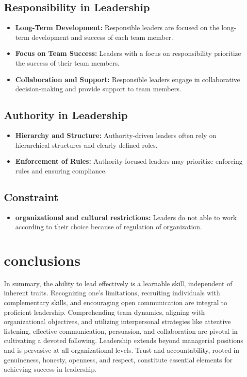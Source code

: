 \documentclass[a4paper,12pt]{report}
\begin{document}
\fontsize{14}{16}\selectfont \section{Responsibility in Leadership}
\fontsize{14}{20}\selectfont   
\begin{itemize}
\item  \textbf{Long-Term Development:} Responsible leaders are focused on the long-term development and success of each team member.
\item  \textbf{Focus on Team Success:} Leaders with a focus on responsibility prioritize the success of their team members.
\item \textbf{Collaboration and Support:} Responsible leaders engage in collaborative decision-making and provide support to team members.
\end{itemize}
\fontsize{14}{16}\selectfont \section{Authority in Leadership}
\fontsize{14}{20}\selectfont   
\begin{itemize}
\item  \textbf{Hierarchy and Structure:} Authority-driven leaders often rely on hierarchical structures and clearly defined roles.
\item  \textbf{Enforcement of Rules:} Authority-focused leaders may prioritize enforcing rules and ensuring compliance.
\end{itemize}
\fontsize{14}{16}\selectfont \section{Constraint}
\fontsize{14}{20}\selectfont   
\begin{itemize}
\item \textbf{organizational and cultural restrictions:} Leaders do not able to work according to their choice because of regulation of organization. 
\end{itemize}
\fontsize{14}{16}\selectfont \chapter{conclusions}
\fontsize{14}{20}\selectfont In summary, the ability to lead effectively is a learnable skill, independent of inherent traits. Recognizing one's limitations, recruiting individuals with complementary skills, and encouraging open communication are integral to proficient leadership. Comprehending team dynamics, aligning with organizational objectives, and utilizing interpersonal strategies like attentive listening, effective communication, persuasion, and collaboration are pivotal in cultivating a devoted following. Leadership extends beyond managerial positions and is pervasive at all organizational levels. Trust and accountability, rooted in genuineness, honesty, openness, and respect, constitute essential elements for achieving success in leadership.
\end{document}
